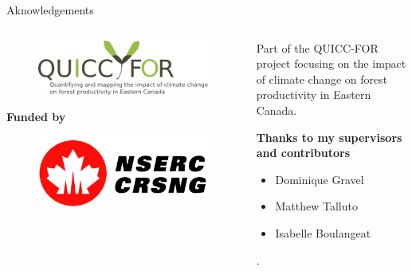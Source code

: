\documentclass[10pt,aspectratio=149]{beamer}
\begin{document}
\begin{frame}[plain]{Aknowledgements}

\begin{columns}[t]
	\begin{column}[t]{.40\paperwidth}
		\begin{figure}
			\includegraphics[width=0.7\linewidth]{logo.png}
		\end{figure}
		\vspace{2em}
		\centering \small{\textbf{Funded by}}
		\begin{figure}
			\includegraphics[width=0.5\linewidth]{nserc.png}
		\end{figure}
	\end{column}
	\begin{column}[t]{.50\paperwidth}

	Part of the QUICC-FOR project focusing on the impact of climate change on forest productivity in Eastern Canada.

	\vspace{3em}

	\textbf{Thanks to my supervisors and contributors}

	\begin{itemize}
		\item Dominique Gravel
		\item Matthew Talluto
		\item Isabelle Boulangeat
	\end{itemize}. 

	\end{column}
\end{columns}


\end{frame}

\end{document}
